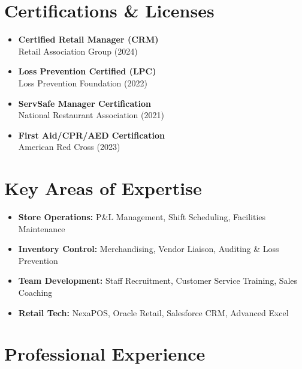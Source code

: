 \documentclass[10pt,letterpaper]{article}
\begin{document}
\noindent
\begin{minipage}[t]{0.48\textwidth}
    \section*{\faAward\enskip Certifications \& Licenses}
    \begin{itemize}
        \item \textbf{Certified Retail Manager (CRM)} \\ Retail Association Group (2024)
        \item \textbf{Loss Prevention Certified (LPC)} \\ Loss Prevention Foundation (2022)
        \item \textbf{ServSafe Manager Certification} \\ National Restaurant Association (2021)
        \item \textbf{First Aid/CPR/AED Certification} \\ American Red Cross (2023)
    \end{itemize}
\end{minipage}%
\hfill
\begin{minipage}[t]{0.48\textwidth}
    \section*{\faList\enskip Key Areas of Expertise}
    \begin{itemize}
        \item \textbf{Store Operations:} P\&L Management, Shift Scheduling, Facilities Maintenance
        \item \textbf{Inventory Control:} Merchandising, Vendor Liaison, Auditing \& Loss Prevention
        \item \textbf{Team Development:} Staff Recruitment, Customer Service Training, Sales Coaching
        \item \textbf{Retail Tech:} NexaPOS, Oracle Retail, Salesforce CRM, Advanced Excel
    \end{itemize}
\end{minipage}

\vspace{4pt}

\section*{\faBriefcase\enskip Professional Experience}
\end{document}
